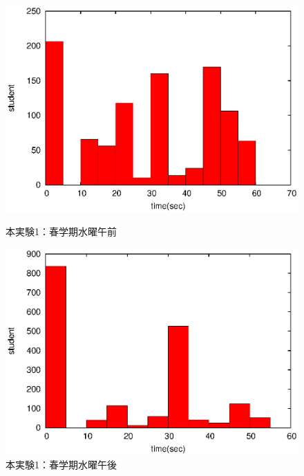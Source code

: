 \documentclass[a4paper,10pt]{jarticle}
\begin{document}
\begin{figure}[htpb]                        
\begin{minipage} {0.5\hsize}                             
\begin{center}                              
\includegraphics[bb=0 0 390 248,clip,width=\hsize]{oWe12_hist.eps}   
\caption{本実験1：春学期水曜午前}                              
\label{oWe12}                                
\end{center}                                    
\end{minipage}                                 
\begin{minipage}{0.5\hsize}                                            
\begin{center}                              
\includegraphics[bb=0 0 390 248,clip,width=\hsize]{oWe345_hist.eps}   
\caption{本実験1：春学期水曜午後}                              
\label{oWe345}                                
\end{center}                                    
\end{minipage}                                 
\end{figure}                                 
\end{document}
